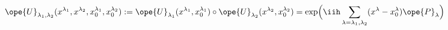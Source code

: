 \begin{equation}	\label{12.110}
\ope{U}_{\lambda_1,\lambda_2}
	(x^{\lambda_1},x^{\lambda_2},x_0^{\lambda_1},x_0^{\lambda_2})
:=
\ope{U}_{\lambda_1}(x^{\lambda_1},x_0^{\lambda_1})\circ
\ope{U}_{\lambda_2}(x^{\lambda_2},x_0^{\lambda_2})
=
\exp\Bigl(\iih \sum_{\lambda=\lambda_1,\lambda_2}
		(x^\lambda-x_0^\lambda)\ope{P}_{\lambda}
    \Bigr)
	\end{equation}

